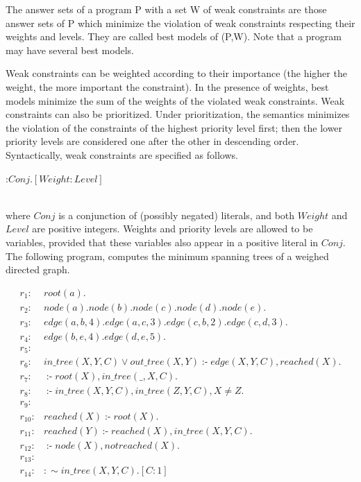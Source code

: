 \documentclass[14pt,a4paper, titlepage]{article}
\DeclareMathOperator{\leftimpl}{:-}
\begin{document}
The answer sets of a program P with a set W of weak constraints are those answer sets of P which minimize the violation of weak constraints respecting their weights and levels. They are called best models of (P,W). Note that a program may have several best models.


Weak constraints can be weighted according to their importance (the higher the weight, the more important the constraint). In the presence of weights, best models minimize the sum of the weights of the violated weak constraints. Weak constraints can also be prioritized. Under prioritization, the semantics minimizes the violation of the constraints of the highest priority level first; then the lower priority levels are considered one after the other in descending order. Syntactically, weak constraints are specified as follows. \\ \centerline{:$\mathit{Conj}. [\mathit{Weight}:\mathit{Level}]$} \\ where $\mathit{Conj}$ is a conjunction of (possibly negated) literals, and both $\mathit{Weight}$ and $\mathit{Level}$ are positive integers. Weights and priority levels are allowed to be variables, provided that these variables also appear in a positive literal in $\mathit{Conj}$.
The following program, computes the minimum spanning trees of a weighed directed graph.
\begin{exmp}
\begin{align*}
r_1\colon& \mathit{root}(a). \\
r_2\colon& \mathit{node}(a). \mathit{node}(b). \mathit{node}(c). \mathit{node}(d). \mathit{node}(e). \\
r_3\colon& \mathit{edge}(a,b,4). \mathit{edge}(a,c,3). \mathit{edge}(c,b,2). \mathit{edge}(c,d,3). \\
r_4\colon& \mathit{edge}(b,e,4). \mathit{edge}(d,e,5). \\
r_5\colon& \\
r_6 \colon & \mathit{in\_tree}(X,Y,C) \vee \mathit{out\_tree}(X,Y) \leftimpl \mathit{edge}(X,Y,C), \mathit{reached}(X). \\
r_7\colon& \leftimpl \mathit{root}(X), \mathit{in\_tree}(\_,X,C).\\
r_8\colon& \leftimpl \mathit{in\_tree}(X,Y,C), \mathit{in\_tree}(Z,Y,C), X \neq Z. \\
r_9\colon&  \\
r_{10}\colon& \mathit{reached}(X) \leftimpl \mathit{root}(X). \\
r_{11}\colon& \mathit{reached}(Y) \leftimpl \mathit{reached}(X), \mathit{in\_tree}(X,Y,C). \\
r_{12}\colon& \leftimpl \mathit{node}(X), \mathit{not} \mathit{reached}(X). \\
r_{13}\colon&   \\
r_{14}\colon&\mathit{ : \sim in\_tree}(X,Y,C). [C:1]
\end{align*}
\end{exmp}
\end{document}

